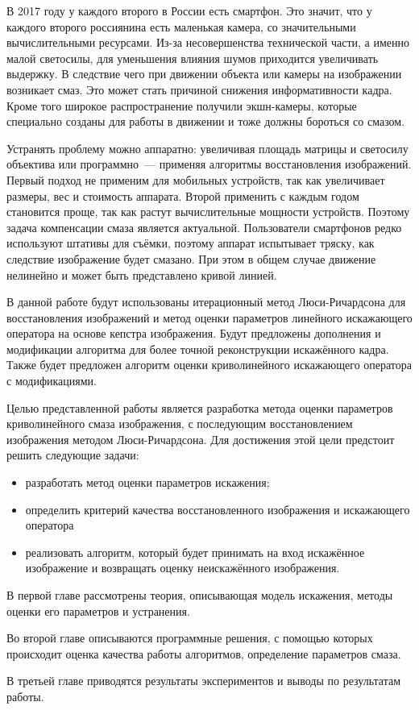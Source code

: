 \intro
В 2017 году у каждого второго в России есть смартфон\cite{mobileUsers}. 
Это значит, что у каждого второго россиянина есть маленькая камера, со значительными вычислительными ресурсами. Из-за несовершенства технической части, а именно малой светосилы, для уменьшения влияния шумов приходится увеличивать выдержку. В следствие чего при движении объекта или камеры на изображении возникает смаз. Это может стать причиной снижения информативности кадра. Кроме того широкое распространение получили экшн-камеры, которые специально созданы для работы в движении и тоже должны бороться со смазом.

Устранять проблему можно аппаратно: увеличивая площадь матрицы и светосилу объектива или программно~--- применяя алгоритмы восстановления изображений. Первый подход не применим для мобильных устройств, так как увеличивает размеры, вес и стоимость аппарата. Второй применить с каждым годом становится проще, так как растут вычислительные мощности устройств. Поэтому задача компенсации смаза является актуальной.
Пользователи смартфонов редко используют штативы для съёмки, поэтому аппарат испытывает тряску, как следствие изображение будет смазано. При этом в общем случае движение нелинейно и может быть представлено кривой линией.

В данной работе будут использованы итерационный метод Люси-Ричардсона для восстановления изображений и метод оценки параметров линейного искажающего оператора на основе кепстра изображения. Будут предложены дополнения и модификации алгоритма для более точной реконструкции искажённого кадра. Также будет предложен алгоритм оценки криволинейного искажающего оператора с модификациями.

Целью представленной работы является разработка метода оценки параметров  криволинейного смаза изображения, с последующим восстановлением изображения методом Люси-Ричардсона. Для достижения этой цели предстоит решить следующие задачи:

\begin{itemize}
\item разработать метод оценки параметров искажения;
\item определить критерий качества восстановленного изображения и искажающего оператора
\item реализовать алгоритм, который будет принимать на вход искажённое изображение и возвращать оценку неискажённого изображения.
\end{itemize}

В первой главе рассмотрены теория, описывающая модель искажения, методы оценки его параметров и устранения.

Во второй главе описываются программные решения, с помощью которых происходит оценка качества работы алгоритмов, определение параметров смаза.

В третьей главе приводятся результаты экспериментов и выводы по результатам работы.